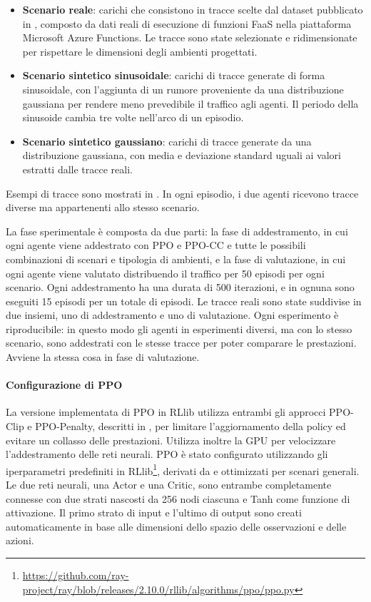\documentclass[a4paper, twocolumn]{article}
\begin{document}
\begin{itemize}
    \item \textbf{Scenario reale}: carichi che consistono in tracce scelte dal dataset pubblicato in \cite{Shahrad2020}, composto da dati reali di esecuzione di funzioni FaaS nella piattaforma Microsoft Azure Functions. Le tracce sono state selezionate e ridimensionate per rispettare le dimensioni degli ambienti progettati.

    \item \textbf{Scenario sintetico sinusoidale}: carichi di tracce generate di forma sinusoidale, con l'aggiunta di un rumore proveniente da una distribuzione gaussiana per rendere meno prevedibile il traffico agli agenti. Il periodo della sinusoide cambia tre volte nell'arco di un episodio.

    \item \textbf{Scenario sintetico gaussiano}: carichi di tracce generate da una distribuzione gaussiana, con media e deviazione standard uguali ai valori estratti dalle tracce reali.
\end{itemize}

Esempi di tracce sono mostrati in . In ogni episodio, i due agenti ricevono tracce diverse ma appartenenti allo stesso scenario.

La fase sperimentale è composta da due parti: la fase di addestramento, in cui ogni agente viene addestrato con PPO e PPO-CC e tutte le possibili combinazioni di scenari e tipologia di ambienti, e la fase di valutazione, in cui ogni agente viene valutato distribuendo il traffico per 50 episodi per ogni scenario. Ogni addestramento ha una durata di 500 iterazioni, e in ognuna sono eseguiti 15 episodi per un totale di  episodi. Le tracce reali sono state suddivise in due insiemi, uno di addestramento e uno di valutazione. Ogni esperimento è riproducibile: in questo modo gli agenti in esperimenti diversi, ma con lo stesso scenario, sono addestrati con le stesse tracce per poter comparare le prestazioni. Avviene la stessa cosa in fase di valutazione.

\paragraph{Configurazione di PPO} La versione implementata di PPO in RLlib utilizza entrambi gli approcci PPO-Clip e PPO-Penalty, descritti in \cite{Schulman2017}, per limitare l'aggiornamento della policy ed evitare un collasso delle prestazioni. Utilizza inoltre la GPU per velocizzare l'addestramento delle reti neurali. PPO è stato configurato utilizzando gli iperparametri predefiniti in RLlib\footnote{\url{https://github.com/ray-project/ray/blob/releases/2.10.0/rllib/algorithms/ppo/ppo.py}}, derivati da \cite{Schulman2017} e ottimizzati per scenari generali. Le due reti neurali, una Actor e una Critic, sono entrambe completamente connesse con due strati nascosti da 256 nodi ciascuna e Tanh come funzione di attivazione. Il primo strato di input e l'ultimo di output sono creati automaticamente in base alle dimensioni dello spazio delle osservazioni e delle azioni.
\end{document}
